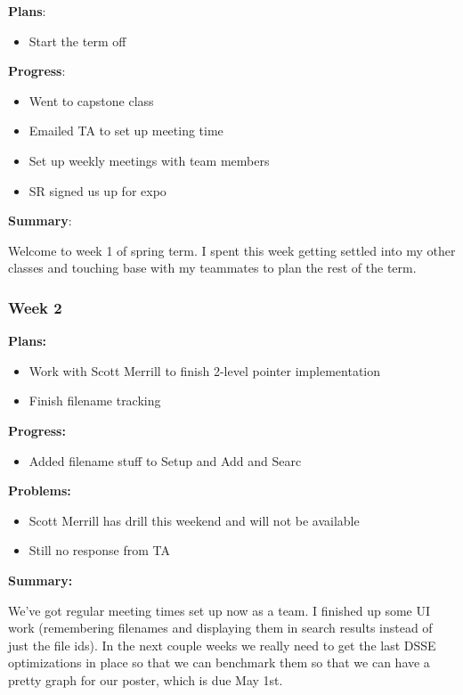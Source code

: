 \noindent \textbf{Plans}:

\begin{itemize}
\item Start the term off 
\end{itemize}

\noindent \textbf{Progress}:

\begin{itemize}
\item Went to capstone class 
\item Emailed TA to set up meeting time 
\item Set up weekly meetings with team members 
\item SR signed us up for expo 
\end{itemize}

\noindent \textbf{Summary}:

Welcome to week 1 of spring term. I spent this week getting settled into my other classes and touching base with my teammates to plan the rest of the term. 

\subsubsection{Week 2}

\noindent \textbf{Plans: }

\begin{itemize}
\item     Work with Scott Merrill to finish 2-level pointer implementation
\item     Finish filename tracking
\end{itemize}

\noindent \textbf{Progress: }

\begin{itemize}
\item     Added filename stuff to Setup and Add and Searc
\end{itemize}

\noindent \textbf{Problems: }

\begin{itemize}
\item     Scott Merrill has drill this weekend and will not be available
\item     Still no response from TA
\end{itemize}

\noindent \textbf{Summary: }

We've got regular meeting times set up now as a team. I finished up some UI work (remembering filenames and displaying them in search results instead of just the file ids). In the next couple weeks we really need to get the last DSSE optimizations in place so that we can benchmark them so that we can have a pretty graph for our poster, which is due May 1st.


